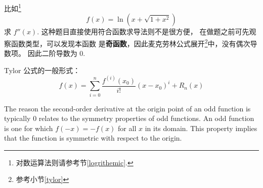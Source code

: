 比如\footnote{对数运算法则请参考节\ref{logrithemic}.}
\[
    f(x) = \ln(x+\sqrt{1+x^2})
\]
求 $f''(x)$.
这种题目直接使用符合函数求导法则不是很方便，
在做题之前可先观察函数类型，可以发现本函数
是\textbf{奇函数}，因此麦克劳林公式展开\footnote{参考小节\ref{tylor}}中，没有偶次导数项。
因此二阶导数为 0.

Tylor 公式的一般形式：
\begin{equation*}
    f(x)=\sum_{i=0}^{n}{\frac{f^{(i)}(x_0)}{i!}(x-x_0)^i}+R_n(x)
\end{equation*}

The reason the second-order derivative at the origin point of an odd function is typically 0 relates to the symmetry properties of odd functions. An odd function is one for which $f(-x) = -f(x)$ for all $x$ in its domain. This property implies that the function is symmetric with respect to the origin.

